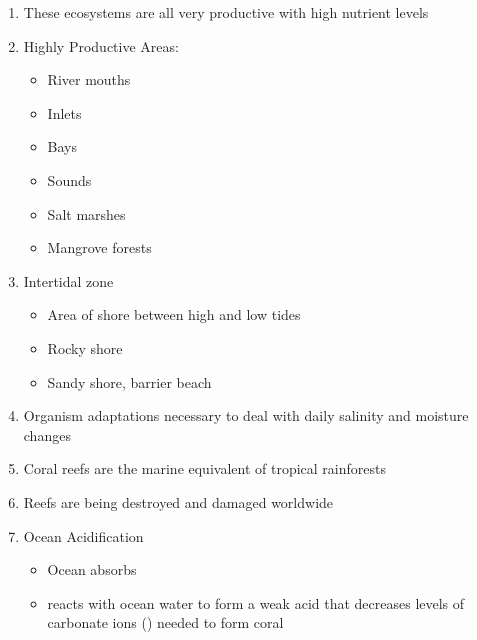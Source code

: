 \documentclass[12pt]{article}
\begin{document}
\begin{enumerate}
  \item These ecosystems are all very productive with high nutrient levels

  \item Highly Productive Areas:

    \begin{itemize}

      \item River mouths

      \item Inlets

      \item Bays

      \item Sounds

      \item Salt marshes

      \item Mangrove forests

    \end{itemize}

  \item Intertidal zone

    \begin{itemize}

      \item Area of shore between high and low tides

      \item Rocky shore

      \item Sandy shore, barrier beach

    \end{itemize}

  \item Organism adaptations necessary to deal with daily salinity and moisture changes

  \item Coral reefs are the marine equivalent of tropical rainforests

  \item Reefs are being destroyed and damaged worldwide

  \item Ocean Acidification

    \begin{itemize}

      \item Ocean absorbs 

      \item {} reacts with ocean water to form a weak acid that decreases levels of carbonate ions () needed to form coral


\end{itemize}
\end{enumerate}
\end{document}
